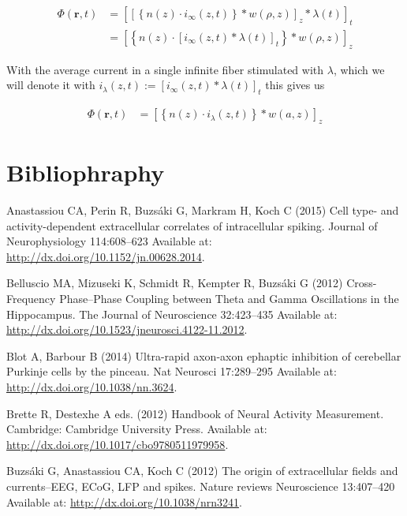 \documentclass[]{article}
\begin{document}
\begin{align}
  \label{eqn:switchedpot}
  \Phi(\mathbf{r},t) & =  \left[\left[\left\{n(z)\cdot i_{\infty}(z,t)\right\}\ast w(\rho,z)\right]_z \ast \lambda(t)\right]_t \\
  & =  \left[\left\{n(z)\cdot \left[i_{\infty}(z,t)\ast \lambda(t)\right]_t\right\}\ast w(\rho,z)\right]_z
\end{align}

With the average current in a single infinite fiber stimulated with
\(\lambda\), which we will denote it with
\(i_\lambda(z,t) := \left[i_{\infty}(z,t)\ast \lambda(t)\right]_t\) this
gives us

\begin{align}
  \Phi(\mathbf{r},t) & =  \left[\left\{n(z)\cdot i_\lambda(z,t)\right\}\ast w(a,z)\right]_z
  \label{eqn:switchedpotend}
\end{align}

\section*{Bibliophraphy}\label{bibliophraphy}

Anastassiou CA, Perin R, Buzsáki G, Markram H, Koch C (2015) Cell type-
and activity-dependent extracellular correlates of intracellular
spiking. Journal of Neurophysiology 114:608--623 Available at:
\url{http://dx.doi.org/10.1152/jn.00628.2014}.

Belluscio MA, Mizuseki K, Schmidt R, Kempter R, Buzsáki G (2012)
Cross-Frequency Phase--Phase Coupling between Theta and Gamma
Oscillations in the Hippocampus. The Journal of Neuroscience 32:423--435
Available at: \url{http://dx.doi.org/10.1523/jneurosci.4122-11.2012}.

Blot A, Barbour B (2014) Ultra-rapid axon-axon ephaptic inhibition of
cerebellar Purkinje cells by the pinceau. Nat Neurosci 17:289--295
Available at: \url{http://dx.doi.org/10.1038/nn.3624}.

Brette R, Destexhe A eds. (2012) Handbook of Neural Activity
Measurement. Cambridge: Cambridge University Press. Available at:
\url{http://dx.doi.org/10.1017/cbo9780511979958}.

Buzsáki G, Anastassiou CA, Koch C (2012) The origin of extracellular
fields and currents--EEG, ECoG, LFP and spikes. Nature reviews
Neuroscience 13:407--420 Available at:
\url{http://dx.doi.org/10.1038/nrn3241}.
\end{document}
